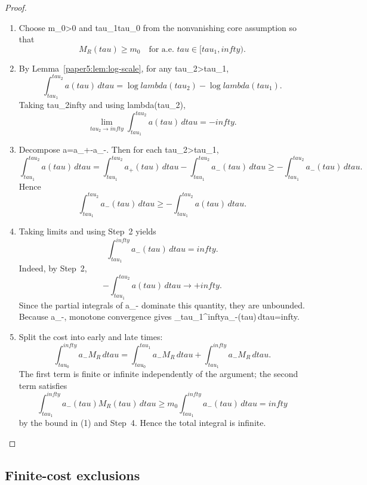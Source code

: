 \documentclass[11pt]{amsart}
\def\({}%
\def\){}%
\def\tau{tau}%
\def\lambda{lambda}%
\def\infty{infty}%
\theoremstyle{plain}
\theoremstyle{definition}
\theoremstyle{remark}
\begin{document}
\begin{proof}
\begin{enumerate}[label=(\arabic*)]
  \item Choose \(m_0>0\) and \(\tau_1\ge\tau_0\) from the nonvanishing
  core assumption so that
  \[
    M_R(\tau)\ge m_0\quad\text{for a.e. }\tau\in[\tau_1,\infty).
  \]

  \item By Lemma~\ref{paper5:lem:log-scale}, for any \(\tau_2>\tau_1\),
  \[
    \int_{\tau_1}^{\tau_2}a(\tau)
    \,d\tau
    =\log\lambda(\tau_2)-\log\lambda(\tau_1).
  \]
  Taking \(\tau_2\to\infty\) and using \(\lambda(\tau_2)\),
  \[
    \lim_{\tau_2\to\infty}\int_{\tau_1}^{\tau_2}a(\tau)
    \,d\tau=-\infty.
  \]

  \item Decompose \(a=a_+-a_-\).  Then for each \(\tau_2>\tau_1\),
  \[
    \int_{\tau_1}^{\tau_2}a(\tau)
    \,d\tau
    =\int_{\tau_1}^{\tau_2}a_+(\tau)
    \,d\tau-\int_{\tau_1}^{\tau_2}a_-(\tau)
    \,d\tau
    \ge-\int_{\tau_1}^{\tau_2}a_-(\tau)
    \,d\tau.
    \]
    Hence
    \[
    \int_{\tau_1}^{\tau_2}a_-(\tau)
    \,d\tau\ge
    -\int_{\tau_1}^{\tau_2}a(\tau)
    \,d\tau.
    \]

  \item Taking limits and using Step~2 yields
  \[
    \int_{\tau_1}^{\infty}a_-(\tau)
    \,d\tau=\infty.
  \]
  Indeed, by Step~2,
  \[
    -\int_{\tau_1}^{\tau_2}a(\tau)\,d\tau\to+\infty.
  \]
  Since the partial integrals of \(a_-\) dominate this quantity, they are unbounded.
  Because \(a_-\), monotone convergence gives
  \(\int_{\tau_1}^{\infty}a_-(\tau)\,d\tau=\infty\).

  \item Split the cost into early and late times:
  \[
    \int_{\tau_0}^{\infty}a_-M_R
    \,d\tau
    =\int_{\tau_0}^{\tau_1}a_-M_R
    \,d\tau+
    \int_{\tau_1}^{\infty}a_-M_R
    \,d\tau.
  \]
  The first term is finite or infinite independently of the argument; the second term
  satisfies
  \[
    \int_{\tau_1}^{\infty}a_-(\tau)M_R(\tau)
    \,d\tau
    \ge m_0\int_{\tau_1}^{\infty}a_-(\tau)
    \,d\tau
    =\infty
  \]
  by the bound in (1) and Step~4.  Hence the total integral is infinite.
\end{enumerate}
\end{proof}

\subsection{Finite-cost exclusions}
\label{paper5:sec:finite-cost}
\end{document}
